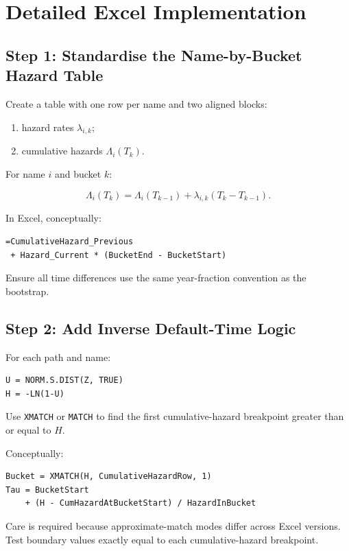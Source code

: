 \documentclass[11pt,a4paper]{article}
\begin{document}
\section{Detailed Excel Implementation}

\subsection{Step 1: Standardise the Name-by-Bucket Hazard Table}

Create a table with one row per name and two aligned blocks:

\begin{enumerate}
    \item hazard rates $\lambda_{i,k}$;
    \item cumulative hazards $\Lambda_i(T_k)$.
\end{enumerate}

For name $i$ and bucket $k$:

\[
\Lambda_i(T_k)
=
\Lambda_i(T_{k-1})
+
\lambda_{i,k}(T_k-T_{k-1}).
\]

In Excel, conceptually:

\begin{lstlisting}
=CumulativeHazard_Previous
 + Hazard_Current * (BucketEnd - BucketStart)
\end{lstlisting}

Ensure all time differences use the same year-fraction convention as the bootstrap.

\subsection{Step 2: Add Inverse Default-Time Logic}

For each path and name:

\begin{lstlisting}
U = NORM.S.DIST(Z, TRUE)
H = -LN(1-U)
\end{lstlisting}

Use \texttt{XMATCH} or \texttt{MATCH} to find the first cumulative-hazard breakpoint greater than or equal to $H$.

Conceptually:

\begin{lstlisting}
Bucket = XMATCH(H, CumulativeHazardRow, 1)
Tau = BucketStart
    + (H - CumHazardAtBucketStart) / HazardInBucket
\end{lstlisting}

Care is required because approximate-match modes differ across Excel versions. Test boundary values exactly equal to each cumulative-hazard breakpoint.
\end{document}
